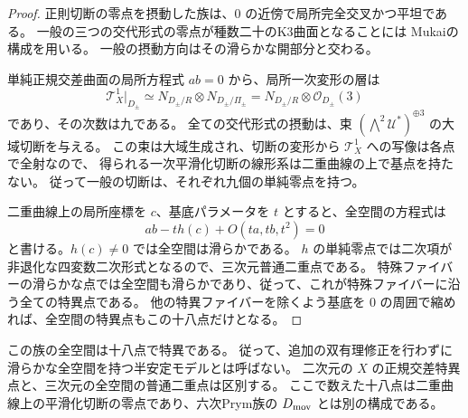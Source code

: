 \begin{proof}
正則切断の零点を摂動した族は、$0$ の近傍で局所完全交叉かつ平坦である。
一般の三つの交代形式の零点が種数二十のK3曲面となることには
Mukaiの構成\cite[Theorem~5.1]{MukaiGenus20}を用いる。
一般の摂動方向はその滑らかな開部分と交わる。

単純正規交差曲面の局所方程式 $ab=0$ から、局所一次変形の層は
\[
 \mathcal T_X^1|_{D_\pm}
   \simeq N_{D_\pm/R}\otimes N_{D_\pm/\Pi_\pm}
   =N_{D_\pm/R}\otimes\mathcal O_{D_\pm}(3)
\]
であり、その次数は九である。
全ての交代形式の摂動は、束
$(\bigwedge^2\mathcal U^*)^{\oplus3}$ の大域切断を与える。
この束は大域生成され、切断の変形から $\mathcal T_X^1$ への写像は各点で全射なので、
得られる一次平滑化切断の線形系は二重曲線の上で基点を持たない。
従って一般の切断は、それぞれ九個の単純零点を持つ。

二重曲線上の局所座標を $c$、基底パラメータを $t$ とすると、全空間の方程式は
\[
 ab-t h(c)+O(ta,tb,t^2)=0
\]
と書ける。$h(c)\ne0$ では全空間は滑らかである。
$h$ の単純零点では二次項が非退化な四変数二次形式となるので、三次元普通二重点である。
特殊ファイバーの滑らかな点では全空間も滑らかであり、従って、これが特殊ファイバーに沿う全ての特異点である。
他の特異ファイバーを除くよう基底を $0$ の周囲で縮めれば、全空間の特異点もこの十八点だけとなる。
\end{proof}

この族の全空間は十八点で特異である。
従って、追加の双有理修正を行わずに滑らかな全空間を持つ半安定モデルとは呼ばない。
二次元の $X$ の正規交差特異点と、三次元の全空間の普通二重点は区別する。
ここで数えた十八点は二重曲線上の平滑化切断の零点であり、六次Prym族の $D_{\rm mov}$ とは別の構成である。
